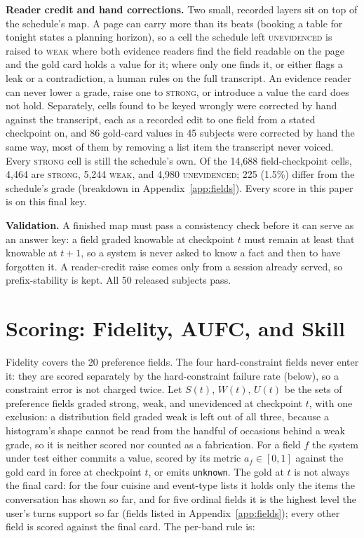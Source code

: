 \documentclass{article}
\begin{document}
\textbf{Reader credit and hand corrections.} Two small, recorded layers sit on top of the
schedule's map. A page can carry more than its beats (booking a table for tonight states a planning
horizon), so a cell the schedule left \textsc{unevidenced} is raised to \textsc{weak} where both
evidence readers find the field readable on the page and the gold card holds a value for it; where
only one finds it, or either flags a leak or a contradiction, a human rules on the full
transcript. An evidence reader can never lower a grade, raise one to \textsc{strong}, or introduce a value the
card does not hold. Separately, cells found to be keyed wrongly were corrected by hand against
the transcript, each as a recorded edit to one field from a stated checkpoint on, and 86
gold-card values in 45 subjects were corrected by hand the same way, most of them by removing a list
item the transcript never voiced. Every
\textsc{strong} cell is still the schedule's own. Of the 14,688 field-checkpoint cells, 4,464 are
\textsc{strong}, 5,244 \textsc{weak}, and 4,980 \textsc{unevidenced}; 225 (1.5\%) differ from the
schedule's grade (breakdown in Appendix~\ref{app:fields}). Every score in this paper is on this
final key.

\textbf{Validation.} A finished map must pass a consistency check before it can serve as an answer
key: a field graded knowable at checkpoint $t$ must remain at least that knowable at $t+1$, so a
system is never asked to know a fact and then to have forgotten it. A reader-credit raise comes only from a
session already served, so prefix-stability is kept. All 50 released subjects pass.

\section{Scoring: Fidelity, AUFC, and Skill}
\label{sec:scoring}

Fidelity covers the 20 preference fields. The four hard-constraint fields never enter it: they are
scored separately by the hard-constraint failure rate (below), so a constraint error is not charged
twice. Let $S(t)$, $W(t)$, $U(t)$ be the sets of preference fields graded
strong, weak, and unevidenced at checkpoint $t$, with one exclusion: a distribution field graded
weak is left out of all three, because a histogram's shape cannot be read from the handful of
occasions behind a weak grade, so it is neither scored nor counted as a fabrication. For a field
$f$ the system under test either commits a value, scored by its metric $a_f\in[0,1]$ against the
gold card in force at checkpoint $t$, or emits \texttt{unknown}. The gold at $t$ is not always the
final card: for the four cuisine and event-type lists it holds only the items the conversation has
shown so far, and for five ordinal fields it is the highest level the user's turns support so far
(fields listed in Appendix~\ref{app:fields}); every other field is scored against the final card.
The per-band rule is:
\end{document}
